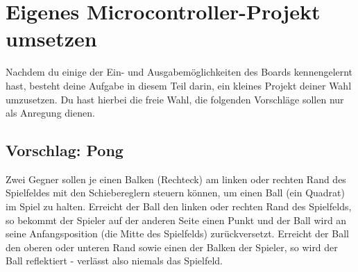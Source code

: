 \section{\ExercisePrefixEmbeddedC Eigenes Microcontroller-Projekt umsetzen \optional}

Nachdem du einige der Ein- und Ausgabemöglichkeiten des Boards kennengelernt hast, besteht deine Aufgabe in diesem Teil darin, ein kleines Projekt deiner Wahl umzusetzen.
Du hast hierbei die freie Wahl, die folgenden Vorschläge sollen nur als Anregung dienen.

\subsection*{Vorschlag: Pong}
Zwei Gegner sollen je einen Balken (Rechteck) am linken oder rechten Rand des Spielfeldes mit den Schiebereglern steuern können, um einen Ball (ein Quadrat) im Spiel zu halten.
Erreicht der Ball den linken oder rechten Rand des Spielfelds, so bekommt der Spieler auf der anderen Seite einen Punkt und der Ball wird an seine Anfangsposition (die Mitte des Spielfelds) zurückversetzt.
Erreicht der Ball den oberen oder unteren Rand sowie einen der Balken der Spieler, so wird der Ball reflektiert - verlässt also niemals das Spielfeld.

